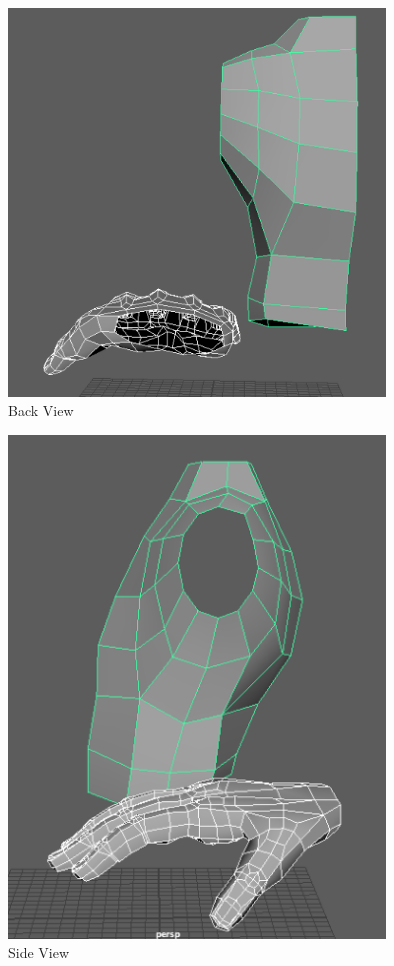 \documentclass[a4paper]{article}
\begin{document}
\begin{figure}[h]
\centering
\includegraphics[width=10cm]{img/Back1.png}
\caption{Back View}
\label{fig:Angle View}
\end{figure}


\begin{figure}[h]
\centering
\includegraphics[width=10cm]{img/Side1.png}
\caption{Side View}
\label{fig:Side View}
\end{figure}
\end{document}
